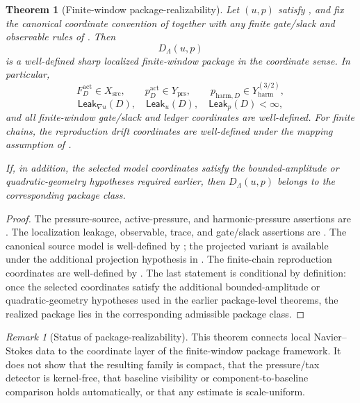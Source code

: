 \documentclass[11pt]{article}
\numberwithin{equation}{section}
\newtheorem{theorem}{Theorem}[section]
\theoremstyle{definition}
\theoremstyle{remark}
\newtheorem{remark}[remark]{Remark}
\newcommand{\src}{\mathrm{src}}
\newcommand{\Leak}{\mathsf{Leak}}
\begin{document}
\begin{theorem}[Finite-window package-realizability]
\label{thm:package-realizability}
Let \((u,p)\) satisfy , and fix the canonical
coordinate convention of  together with any
finite gate/slack and observable rules of
.  Then
\[
    D_\Lambda(u,p)
\]
is a well-defined sharp localized finite-window package in the coordinate
sense.  In particular,
\[
    F_D^{\mathrm{act}}\in X_{\src},
    \qquad
    p_D^{\mathrm{act}}\in Y_{\mathrm{prs}},
    \qquad
    p_{\mathrm{harm},D}\in Y_{\mathrm{harm}}^{(3/2)},
\]
\[
    \Leak_{\nabla u}(D),\quad \Leak_u(D),\quad \Leak_p(D)<\infty,
\]
and all finite-window gate/slack and ledger coordinates are well-defined.  For
finite chains, the reproduction drift coordinates are well-defined under the
mapping assumption of .

If, in addition, the selected model coordinates satisfy the bounded-amplitude
or quadratic-geometry hypotheses required earlier, then \(D_\Lambda(u,p)\)
belongs to the corresponding package class.
\end{theorem}

\begin{proof}
The pressure-source, active-pressure, and harmonic-pressure assertions are
.  The localization leakage,
observable, trace, and gate/slack assertions are
.  The canonical source model is
well-defined by ; the projected variant is
available under the additional projection hypothesis in
.  The finite-chain reproduction
coordinates are well-defined by .  The
last statement is conditional by definition: once the selected coordinates
satisfy the additional bounded-amplitude or quadratic-geometry hypotheses used
in the earlier package-level theorems, the realized package lies in the
corresponding admissible package class.
\end{proof}

\begin{remark}[Status of package-realizability]
\label{rem:realizability-status}
This theorem connects local Navier--Stokes data to the coordinate layer of the
finite-window package framework.  It does not show that the resulting family is
compact, that the pressure/tax detector is kernel-free, that baseline visibility
or component-to-baseline comparison holds automatically, or that any estimate is
scale-uniform.
\end{remark}
\end{document}
